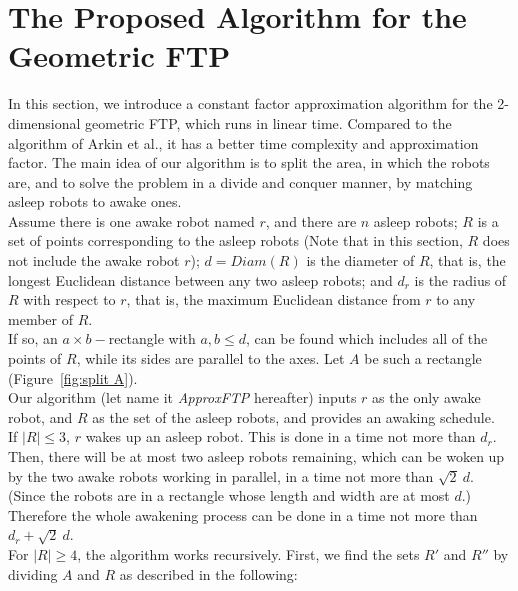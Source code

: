 \documentclass[review]{elsarticle}
\begin{document}
\section{The Proposed Algorithm for the Geometric FTP}
In this section, we introduce a constant factor approximation algorithm for the 2-dimensional geometric FTP, which runs in linear time.
Compared to the algorithm of Arkin et al., it has a better time complexity and approximation factor.
The main idea of our algorithm is to split the area, in which the robots are, and to solve the problem in a divide and conquer manner, by matching asleep robots to awake ones.\\
Assume there is one awake robot named $r$, and there are $n$ asleep robots; $R$ is a set of points corresponding to the asleep robots (Note that in this section, $R$ does not include the awake robot $r$); ${ d=Diam(R) }$ is the diameter of $R$, that is, the longest Euclidean distance between any two asleep robots; and $d_r$ is the radius of $R$ with respect to $r$, that is, the maximum Euclidean distance from $r$ to any member of $R$.\\
If so, an ${a\times b-}$rectangle with ${ a,b \leq d }$, can be found which includes all of the points of $R$, while its sides are parallel to the axes. Let $A$ be such a rectangle (Figure~\ref{fig:split A}). \\
Our algorithm (let name it \textit{ApproxFTP} hereafter) inputs $r$ as the only awake robot, and $R$ as the set of the asleep robots, and provides an awaking schedule.\\
If ${|R| \leq 3 }$, $r$ wakes up an asleep robot. This is done in a time not more than $d_r$. Then, there will be at most two asleep robots remaining, which can be woken up by the two awake robots working in parallel, in a time not more than ${ \sqrt{2}~d }$. (Since the robots are in a rectangle whose length and width are at most $d$.) Therefore the whole awakening process can be done in a time not more than ${ d_r+\sqrt{2}~d }$.\\
For ${|R| \geq 4 }$, the algorithm works recursively. First, we find the sets $R'$ and $R''$ by dividing $A$ and $R$ as described in the following:\\
\end{document}
